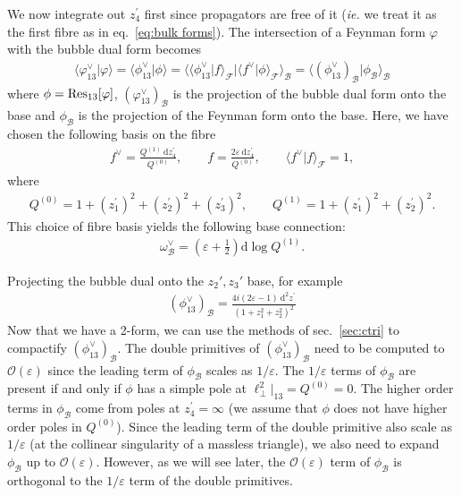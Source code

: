 \documentclass[11pt]{article}
\renewcommand{\sec}[1]{sec.~\ref{#1}}
\renewcommand{\d}{\text{d}}
\newcommand{\la}{\langle}
\newcommand{\ra}{\rangle}
\newcommand{\F}{\mathcal{F}}
\renewcommand{\O}{\mathcal{O}}
\newcommand{\B}{\mathcal{B}}
\newcommand{\res}{{\rm Res}}
\newcommand{\vphi}{\varphi}
\newcommand{\vep}{\varepsilon}
\begin{document}
We now integrate out $z_4^\prime$ first since propagators are free of it ({\it ie.} we treat it as the first fibre as in eq.~\eqref{eq:bulk forms}). The intersection of a Feynman form $\vphi$ with the bubble dual form becomes 
\begin{align}
	\la \vphi^\vee_{13} \vert \vphi \ra
	= \la \phi^\vee_{13} \vert \phi \ra
	= \big\la 
		\la \phi^\vee_{13} \vert f \ra_\F 
	\big\vert 
		\la f^\vee \vert \phi \ra_\F 
	\big\ra_{\B}
	= \big\la 
		(\phi^\vee_{13})_\B
	\big\vert 
		\phi_\B
	\big\ra_{\B}
\end{align}
where $\phi = \res_{13}[\vphi]$, $(\vphi^\vee_{13})_\B$ is the projection of the bubble dual form onto the base and $\phi_\B$ is the projection of the Feynman form onto the base. 
Here, we have chosen the following basis on the fibre
\begin{align}
	f^\vee = \frac{Q^{(1)}\ \d z_4^\prime}{Q^{(0)}},
	\qquad
	f = \frac{2\vep\ \d z_4^\prime}{Q^{(0)}},
	\qquad 
	\la f^\vee \vert f \ra_\F = 1,
\end{align}
where 
\begin{align}
	Q^{(0)} = 1 + (z_1^\prime)^2 + (z_2^\prime)^2 + (z_3^\prime)^2,
	\qquad 
	Q^{(1)} = 1 + (z_1^\prime)^2 + (z_2^\prime)^2 .
\end{align}
This choice of fibre basis yields the following base connection: 
\begin{align}
	\omega_\B^\vee = \left(\vep+\tfrac12\right) \d\log Q^{(1)}.	
\end{align}



Projecting the bubble dual onto the $z_2',z_3'$ base, for example
\begin{align}
	(\phi_{13}^\vee)_\B
	= \frac{4i(2\vep-1)\ \d^2z^\prime}{(1+z_1^2+z_2^2)^2}
\end{align}
Now that we have a 2-form, we can use the methods of \sec{sec:ctri} to compactify $(\phi_{13}^\vee)_\B$. 
The double primitives of $(\phi_{13}^\vee)_\B$ need to be computed to $\O(\vep)$ since the leading term of $\phi_\B$ scales as $1/\vep$. 
The $1/\vep$ terms of $\phi_\B$ are present if and only if $\phi$ has a simple pole at $\ell_\perp^2\vert_{13}=Q^{(0)}=0$. 
The higher order terms in $\phi_\B$ come from poles at $z_4^\prime=\infty$ (we assume that $\phi$ does not have higher order poles in $Q^{(0)}$).  
Since the leading term of the double primitive also scale as $1/\vep$ (at the collinear singularity of a massless triangle), we also need to expand $\phi_\B$ up to $\O(\vep)$. 
However, as we will see later, the $\O(\vep)$ term of $\phi_\B$ is orthogonal to the $1/\vep$ term of the double primitives. 
\end{document}
